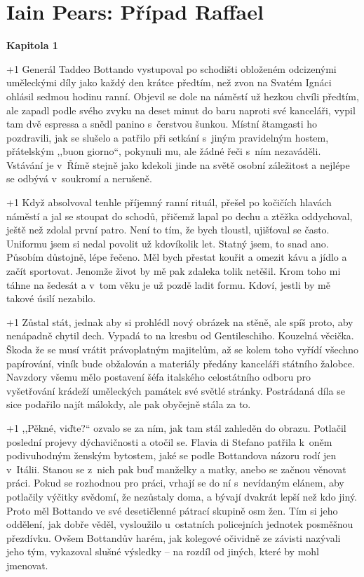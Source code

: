 \medskip 
\section{Iain Pears: Případ Raffael}

\noindent
\textbf{Kapitola 1}

\medskip

\noindent
\looseness+1 Generál Taddeo Bottando vystupoval po schodišti obloženém odcizenými uměleckými díly jako každý den krátce předtím, než zvon na Svatém Ignáci ohlásil sedmou hodinu ranní. Objevil se dole na náměstí už hezkou chvíli předtím, ale zapadl podle svého zvyku na deset minut do baru naproti své kanceláři, vypil tam dvě espressa a snědl panino s čerstvou šunkou. Místní štamgasti ho pozdravili, jak se slušelo a patřilo při setkání s jiným pravidelným hostem, přátelským ,,buon giorno``, pokynuli mu, ale žádné řeči s ním nezaváděli. Vstávání je v Římě stejně jako kdekoli jinde na světě osobní záležitost a nejlépe se odbývá v soukromí a nerušeně.

\looseness+1 Když absolvoval tenhle příjemný ranní rituál, přešel po kočičích hlavách náměstí a jal se stoupat do schodů, přičemž lapal po dechu a ztěžka oddychoval, ještě než zdolal první patro. Není to tím, že bych tloustl, ujišťoval se často. Uniformu jsem si nedal povolit už kdovíkolik let. Statný jsem, to snad ano. Působím důstojně, lépe řečeno. Měl bych přestat kouřit a omezit kávu a jídlo a začít sportovat. Jenomže život by mě pak zdaleka tolik netěšil. Krom toho mi táhne na šedesát a v tom věku je už pozdě ladit formu. Kdoví, jestli by mě takové úsilí nezabilo.

\looseness+1 Zůstal stát, jednak aby si prohlédl nový obrázek na stěně, ale spíš proto, aby nenápadně chytil dech. Vypadá to na kresbu od Gentileschiho. Kouzelná věcička. Škoda že se musí vrátit právoplatným majitelům, až se kolem toho vyřídí všechno papírování, viník bude obžalován a materiály předány kanceláři státního žalobce. Navzdory všemu mělo postavení šéfa italského celostátního odboru pro vyšetřování krádeží uměleckých památek své světlé stránky. Postrádaná díla se sice podařilo najít málokdy, ale pak obyčejně stála za to.

\looseness+1 ,,Pěkné, viďte?`` ozvalo se za ním, jak tam stál zahleděn do obrazu. Potlačil poslední projevy dýchavičnosti a otočil se. Flavia di Stefano patřila k oněm podivuhodným ženským bytostem, jaké se podle Bottandova názoru rodí jen v Itálii. Stanou se z nich pak buď manželky a matky, anebo se začnou věnovat práci. Pokud se rozhodnou pro práci, vrhají se do ní s nevídaným elánem, aby potlačily výčitky svědomí, že nezůstaly doma, a bývají dvakrát lepší než kdo jiný. Proto měl Bottando ve své desetičlenné pátrací skupině osm žen. Tím si jeho oddělení, jak dobře věděl, vysloužilo u~ostatních policejních jednotek posměšnou přezdívku. Ovšem Bottandův harém, jak kolegové očividně ze závisti nazývali jeho tým, vykazoval slušné výsledky -- na rozdíl od jiných, které by mohl jmenovat.

